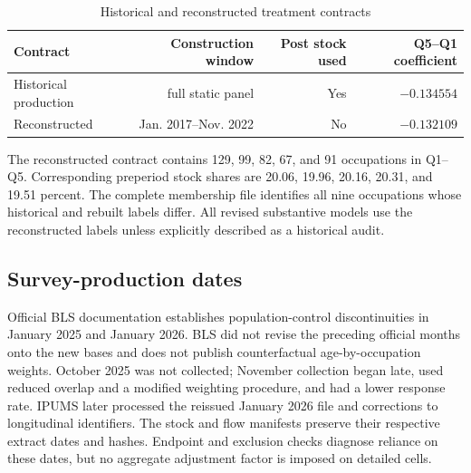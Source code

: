 \begin{table}[!htbp]
\centering
\caption{Historical and reconstructed treatment contracts}\label{tab:app_treatment}
\begin{tabular}{lrrr}
\toprule
Contract & Construction window & Post stock used & Q5--Q1 coefficient \\
\midrule
Historical production & full static panel & Yes & $-0.134554$ \\
Reconstructed & Jan. 2017--Nov. 2022 & No & $-0.132109$ \\
\bottomrule
\end{tabular}
\end{table}

The reconstructed contract contains 129, 99, 82, 67, and 91 occupations in Q1--Q5.  Corresponding preperiod stock shares are 20.06, 19.96, 20.16, 20.31, and 19.51 percent.  The complete membership file identifies all nine occupations whose historical and rebuilt labels differ.  All revised substantive models use the reconstructed labels unless explicitly described as a historical audit.

\subsection{Survey-production dates}

Official BLS documentation establishes population-control discontinuities in January 2025 and January 2026.  BLS did not revise the preceding official months onto the new bases and does not publish counterfactual age-by-occupation weights.  October 2025 was not collected; November collection began late, used reduced overlap and a modified weighting procedure, and had a lower response rate.  IPUMS later processed the reissued January 2026 file and corrections to longitudinal identifiers.  The stock and flow manifests preserve their respective extract dates and hashes.  Endpoint and exclusion checks diagnose reliance on these dates, but no aggregate adjustment factor is imposed on detailed cells.
